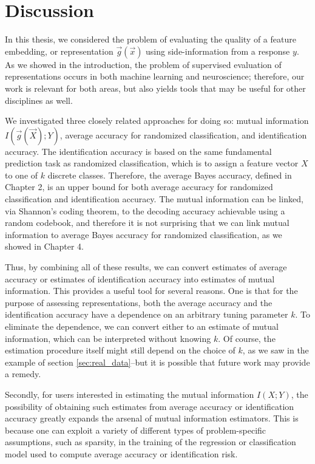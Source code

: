 
\chapter{Discussion} %

\label{Chapter6} %

In this thesis, we considered the problem of evaluating the quality of
a feature embedding, or representation $\vec{g}(\vec{x})$ using
side-information from a response $y$.  As we showed in the
introduction, the problem of supervised evaluation of representations
occurs in both machine learning and neuroscience; therefore, our work
is relevant for both areas, but also yields tools that may be useful
for other disciplines as well.

We investigated three closely related approaches for doing so: mutual
information $I(\vec{g}(\vec{X}); Y)$, average accuracy for randomized
classification, and identification accuracy.  The identification
accuracy is based on the same fundamental prediction task as
randomized classification, which is to assign a feature vector $X$ to
one of $k$ discrete classes.  Therefore, the average Bayes accuracy,
defined in Chapter 2, is an upper bound for both average accuracy for
randomized classification and identification accuracy.  The mutual
information can be linked, via Shannon's coding theorem, to the
decoding accuracy achievable using a random codebook, and therefore it
is not surprising that we can link mutual information to average Bayes
accuracy for randomized classification, as we showed in Chapter 4.

Thus, by combining all of these results, we can convert estimates of
average accuracy or estimates of identification accuracy into
estimates of mutual information.  This provides a useful tool for
several reasons.  One is that for the purpose of assessing
representations, both the average accuracy and the identification
accuracy have a dependence on an arbitrary tuning parameter $k$.  To
eliminate the dependence, we can convert either to an estimate of
mutual information, which can be interpreted without knowing $k$.  Of
course, the estimation procedure itself might still depend on the
choice of $k$, as we saw in the example of section
\ref{sec:real_data}--but it is possible that future work may provide a
remedy.

Secondly, for users interested in estimating the mutual information
$I(X; Y)$, the possibility of obtaining such estimates from average
accuracy or identification accuracy greatly expands the arsenal of
mutual information estimators.  This is because one can exploit a
variety of different types of problem-specific assumptions, such as
sparsity, in the training of the regression or classification model
used to compute average accuracy or identification risk.

